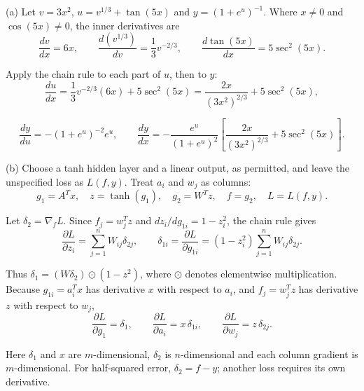(a) Let \(v=3x^2\), \(u=v^{1/3}+\tan(5x)\) and \(y=(1+e^u)^{-1}\). Where \(x\ne0\) and \(\cos(5x)\ne0\), the inner derivatives are
\[
\frac{dv}{dx}=6x,\qquad
\frac{d(v^{1/3})}{dv}=\frac13v^{-2/3},\qquad
\frac{d\tan(5x)}{dx}=5\sec^2(5x).
\]


Apply the chain rule to each part of \(u\), then to \(y\):
\[
\frac{du}{dx}=\frac13v^{-2/3}(6x)+5\sec^2(5x)
=\frac{2x}{(3x^2)^{2/3}}+5\sec^2(5x),
\]



\[
\frac{dy}{du}=-(1+e^u)^{-2}e^u,
\qquad
\frac{dy}{dx}=-\frac{e^u}{(1+e^u)^2}
\left[\frac{2x}{(3x^2)^{2/3}}+5\sec^2(5x)\right].
\]


(b) Choose a tanh hidden layer and a linear output, as permitted, and leave the unspecified loss as \(L(f,y)\). Treat \(a_i\) and \(w_j\) as columns:
\[
g_1=A^Tx,\quad z=\tanh(g_1),\quad
g_2=W^Tz,\quad f=g_2,\quad L=L(f,y).
\]


Let \(\delta_2=\nabla_f L\). Since \(f_j=w_j^Tz\) and \(dz_i/dg_{1i}=1-z_i^2\), the chain rule gives
\[
\frac{\partial L}{\partial z_i}=\sum_{j=1}^n W_{ij}\delta_{2j},\qquad
\delta_{1i}=\frac{\partial L}{\partial g_{1i}}
=(1-z_i^2)\sum_{j=1}^n W_{ij}\delta_{2j}.
\]


Thus \(\delta_1=(W\delta_2)\odot(1-z^2)\), where \(\odot\) denotes elementwise multiplication. Because \(g_{1i}=a_i^Tx\) has derivative \(x\) with respect to \(a_i\), and \(f_j=w_j^Tz\) has derivative \(z\) with respect to \(w_j\),
\[
\frac{\partial L}{\partial g_1}=\delta_1,\qquad
\frac{\partial L}{\partial a_i}=x\,\delta_{1i},\qquad
\frac{\partial L}{\partial w_j}=z\,\delta_{2j}.
\]


Here \(\delta_1\) and \(x\) are \(m\)-dimensional, \(\delta_2\) is \(n\)-dimensional and each column gradient is \(m\)-dimensional. For half-squared error, \(\delta_2=f-y\); another loss requires its own derivative.
